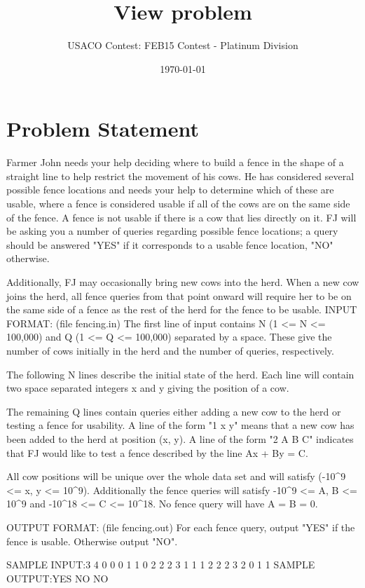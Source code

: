 \documentclass[12pt]{article}
\title{View problem}
\author{USACO Contest: FEB15 Contest - Platinum Division}
\date{\today}
\begin{document}
\maketitle

\section*{Problem Statement}

Farmer John needs your help deciding where to build a fence in the shape of a straight line to help restrict the movement of his cows.  He has considered several possible fence locations and needs your help to determine which of these are usable, where a fence is considered usable if all of the cows are on the same side of the fence.  A fence is not usable if there is a cow that lies directly on it.  FJ will be asking you a number of queries regarding possible fence locations; a query should be answered "YES" if it corresponds to a usable fence location, "NO" otherwise.

Additionally, FJ may occasionally bring new cows into the herd.  When a new cow joins the herd, all fence queries from that point onward will require her to be on the same side of a fence as the rest of the herd for the fence to be usable.
INPUT FORMAT: (file fencing.in)
The first line of input contains N (1 <= N <= 100,000) and Q (1 <= Q <= 100,000) separated by a space.  These give the number of cows initially in the herd and the number of queries, respectively.

The following N lines describe the initial state of the herd. Each line will contain two space separated integers x and y giving the position of a cow.

The remaining Q lines contain queries either adding a new cow to the herd or testing a fence for usability.  A line of the form "1 x y" means that a new cow has been added to the herd at position (x, y).  A line of the form "2 A B C" indicates that FJ would like to test a fence described by the line Ax + By = C.

All cow positions will be unique over the whole data set and will satisfy (-10^9 <= x, y <= 10^9).  Additionally the fence queries will satisfy -10^9 <= A, B <= 10^9 and -10^18 <= C <= 10^18.  No fence query will have A = B = 0.

OUTPUT FORMAT: (file fencing.out)
For each fence query, output "YES" if the fence is usable.  Otherwise output "NO".

SAMPLE INPUT:3 4
0 0
0 1
1 0
2 2 2 3
1 1 1
2 2 2 3
2 0 1 1
SAMPLE OUTPUT:YES
NO
NO
\end{document}
